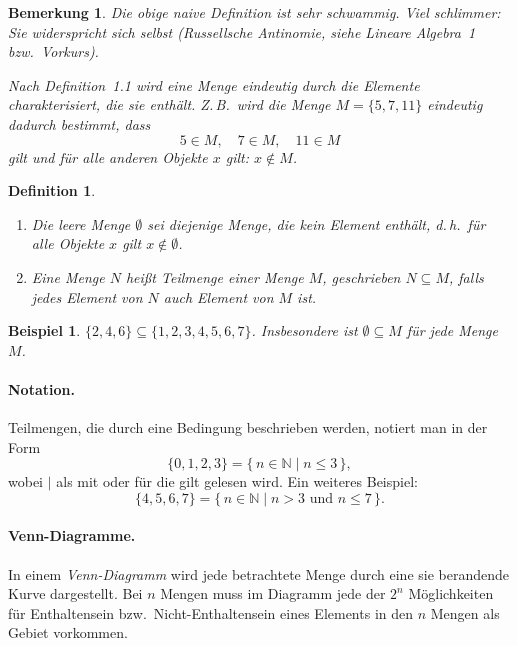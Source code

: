 \documentclass[a4paper]{article}
\theoremstyle{kurzskript}
\newtheorem{definition}[satz]{Definition}
\newtheorem*{bsp}{Beispiel}
\newtheorem*{bem}{Bemerkung}
\newcommand{\N}{\mathbb{N}}
\begin{document}
\begin{bem}
Die obige naive Definition ist sehr schwammig. Viel schlimmer: Sie widerspricht sich selbst (Russellsche Antinomie, siehe Lineare Algebra~1 bzw.\ Vorkurs).

Nach Definition~1.1 wird eine Menge eindeutig durch die Elemente charakterisiert, die sie enthält. Z.\,B.\ wird die Menge $M = \{5, 7, 11\}$ eindeutig dadurch bestimmt, dass
\[
  5 \in M,\quad 7 \in M,\quad 11 \in M
\]
gilt und für alle anderen Objekte $x$ gilt: $x \notin M$.
\end{bem}

\begin{definition}
\leavevmode
\begin{enumerate}[label=(\alph*)]
  \item Die \emph{leere Menge} $\emptyset$ sei diejenige Menge, die kein Element enthält, d.\,h.\ für alle Objekte $x$ gilt $x \notin \emptyset$.
  \item Eine Menge $N$ heißt \emph{Teilmenge} einer Menge $M$, geschrieben $N \subseteq M$, falls jedes Element von $N$ auch Element von $M$ ist.
\end{enumerate}
\end{definition}

\begin{bsp}
$\{2, 4, 6\} \subseteq \{1, 2, 3, 4, 5, 6, 7\}$. Insbesondere ist $\emptyset \subseteq M$ für jede Menge $M$.
\end{bsp}

\paragraph{Notation.}
Teilmengen, die durch eine Bedingung beschrieben werden, notiert man in der Form
\[
  \{0, 1, 2, 3\} = \{\, n \in \N \mid n \leq 3 \,\},
\]
wobei \glqq$\mid$\grqq{} als \glqq mit\grqq{} oder \glqq für die gilt\grqq{} gelesen wird. Ein weiteres Beispiel:
\[
  \{4, 5, 6, 7\} = \{\, n \in \N \mid n > 3 \text{ und } n \leq 7 \,\}.
\]

\paragraph{Venn-Diagramme.}
In einem \emph{Venn-Diagramm} wird jede betrachtete Menge durch eine sie berandende Kurve dargestellt. Bei $n$ Mengen muss im Diagramm jede der $2^n$ Möglichkeiten für Enthaltensein bzw.\ Nicht-Enthaltensein eines Elements in den $n$ Mengen als Gebiet vorkommen.
\end{document}
